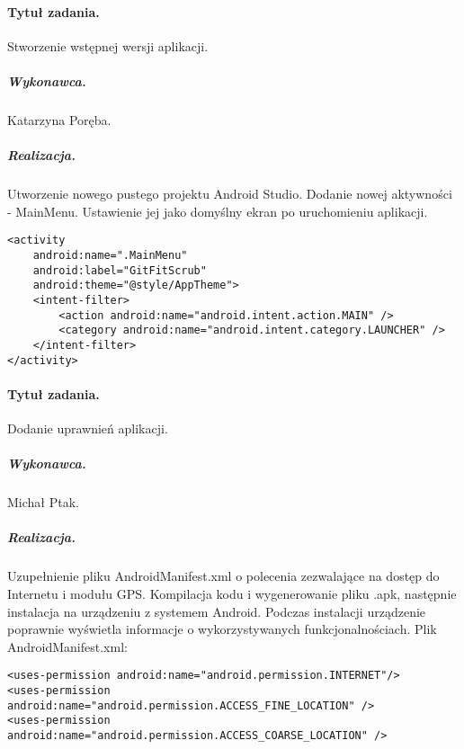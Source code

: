 \documentclass[a4paper]{article}
\begin{document}
\paragraph{Tytuł zadania.} Stworzenie wstępnej wersji aplikacji.
\subparagraph{Wykonawca.} Katarzyna Poręba.
\subparagraph{Realizacja.} Utworzenie nowego pustego projektu Android Studio. Dodanie nowej aktywności - MainMenu. Ustawienie jej jako domyślny ekran po uruchomieniu aplikacji.
\begin{lstlisting}[style=xml]
	<activity
	android:name=".MainMenu"
	android:label="GitFitScrub"
	android:theme="@style/AppTheme">
	<intent-filter>
		<action android:name="android.intent.action.MAIN" />
		<category android:name="android.intent.category.LAUNCHER" />
	</intent-filter>
</activity>
\end{lstlisting}

\paragraph{Tytuł zadania.} Dodanie uprawnień aplikacji.
\subparagraph{Wykonawca.} Michał Ptak.
\subparagraph{Realizacja.} Uzupełnienie pliku AndroidManifest.xml o polecenia zezwalające na dostęp do Internetu i modułu GPS. Kompilacja kodu i wygenerowanie pliku .apk, następnie instalacja na urządzeniu z systemem Android. Podczas instalacji urządzenie poprawnie wyświetla informacje o wykorzystywanych funkcjonalnościach.
Plik AndroidManifest.xml:
\begin{lstlisting}[style=xml]
	<uses-permission android:name="android.permission.INTERNET"/>
<uses-permission android:name="android.permission.ACCESS_FINE_LOCATION" />
<uses-permission android:name="android.permission.ACCESS_COARSE_LOCATION" />
\end{lstlisting}
\end{document}
